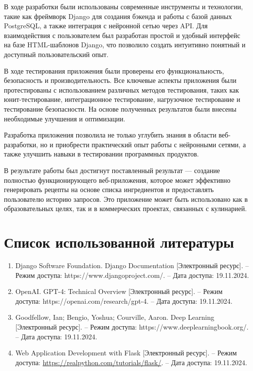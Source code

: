 {{    В ходе разработки были использованы современные инструменты и технологии, такие как фреймворк Django для создания бэкенда и работы с базой данных PostgreSQL, а также интеграция с нейронной сетью через API. Для взаимодействия с пользователем был разработан простой и удобный интерфейс на базе HTML-шаблонов Django, что позволило создать интуитивно понятный и доступный пользовательский опыт.
    
    В ходе тестирования приложения были проверены его функциональность, безопасность и производительность. Все ключевые аспекты приложения были протестированы с использованием различных методов тестирования, таких как юнит-тестирование, интеграционное тестирование, нагрузочное тестирование и тестирование безопасности. На основе полученных результатов были внесены необходимые улучшения и оптимизации.
    
    Разработка приложения позволила не только углубить знания в области веб-разработки, но и приобрести практический опыт работы с нейронными сетями, а также улучшить навыки в тестировании программных продуктов. 
    
    В результате работы был достигнут поставленный результат — создание полностью функционирующего веб-приложения, которое может эффективно генерировать рецепты на основе списка ингредиентов и предоставлять пользователю историю запросов. Это приложение может быть использовано как в образовательных целях, так и в коммерческих проектах, связанных с кулинарией.
}
\newpage


    \section{Список использованной литературы}
    \sloppy
    {
        \begin{enumerate}
           \item Django Software Foundation. Django Documentation [Электронный ресурс]. – Режим доступа: https://www.djangoproject.com/. – Дата доступа: 19.11.2024.
        \item OpenAI. GPT-4: Technical Overview [Электронный ресурс]. – Режим доступа: https://openai.com/research/gpt-4. – Дата доступа: 19.11.2024.
        \item Goodfellow, Ian; Bengio, Yoshua; Courville, Aaron. Deep Learning [Электронный ресурс]. – Режим доступа: https://www.deeplearningbook.org/. – Дата доступа: 19.11.2024.  
        \item Web Application Development with Flask [Электронный ресурс]. – Режим доступа: \url{https://realpython.com/tutorials/flask/}. – Дата доступа: 19.11.2024.  

        \end{enumerate}
    }

}